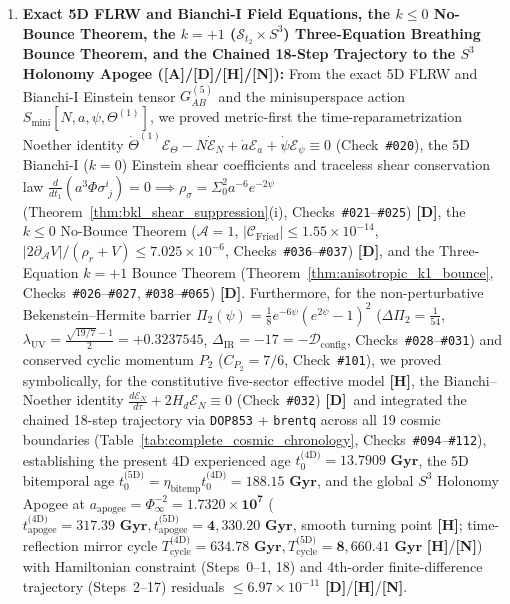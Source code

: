 \documentclass[11pt,a4paper]{article}
\newcommand{\catA}{\textbf{\textcolor{purple!80!black}{[A]}}}
\newcommand{\catD}{\textbf{\textcolor{blue!75!black}{[D]}}}
\newcommand{\catH}{\textbf{\textcolor{orange!85!black}{[H]}}}
\newcommand{\catN}{\textbf{\textcolor{teal!75!black}{[N]}}}
\theoremstyle{plain}
\theoremstyle{definition}
\theoremstyle{remark}
\numberwithin{equation}{section}
\begin{document}
\begin{enumerate}
    \item \textbf{Exact 5D FLRW and Bianchi-I Field Equations, the $k \le 0$ No-Bounce Theorem, the $k = +1$ ($\mathcal{S}_{t_2} \times S^3$) Three-Equation Breathing Bounce Theorem, and the Chained 18-Step Trajectory to the $S^3$ Holonomy Apogee (\catA/\catD/\catH/\catN):} From the exact 5D FLRW and Bianchi-I Einstein tensor $G_{AB}^{(5)}$ and the minisuperspace action $S_{\text{mini}}[N,a,\psi,\Theta^{(1)}]$, we proved metric-first the time-reparametrization Noether identity $\dot{\Theta}^{(1)}\mathcal{E}_{\Theta} - N\dot{\mathcal{E}}_N + \dot{a}\mathcal{E}_a + \dot{\psi}\mathcal{E}_{\psi} \equiv 0$ (Check~\texttt{\#020}), the 5D Bianchi-I ($k = 0$) Einstein shear coefficients and traceless shear conservation law $\frac{d}{dt_1}(a^3\Phi\sigma^i_{\;j}) = 0 \implies \rho_{\sigma} = \Sigma_0^2 a^{-6}e^{-2\psi}$ (Theorem~\ref{thm:bkl_shear_suppression}(i), Checks~\texttt{\#021}--\texttt{\#025}) \catD, the $k \le 0$ No-Bounce Theorem ($\mathcal{A} = 1$, $|\mathcal{C}_{\text{Fried}}| \le 1.55 \times 10^{-14}$, $|2\partial_{\mathcal{A}}V|/(\rho_r+V) \le 7.025 \times 10^{-6}$, Checks~\texttt{\#036}--\texttt{\#037}) \catD, and the Three-Equation $k = +1$ Bounce Theorem (Theorem~\ref{thm:anisotropic_k1_bounce}, Checks~\texttt{\#026}--\texttt{\#027}, \texttt{\#038}--\texttt{\#065}) \catD. Furthermore, for the non-perturbative Bekenstein--Hermite barrier $\Pi_2(\psi) = \frac{1}{8}e^{-6\psi}(e^{2\psi}-1)^2$ ($\Delta\Pi_2 = \frac{1}{54}$, $\lambda_{\text{UV}} = \frac{\sqrt{19/7}-1}{2} = +0.3237545$, $\Delta_{\text{IR}} = -17 = -\mathcal{D}_{\text{config}}$, Checks~\texttt{\#028}--\texttt{\#031}) and conserved cyclic momentum $P_2$ ($C_{P_2} = 7/6$, Check~\texttt{\#101}), we proved symbolically, for the constitutive five-sector effective model \catH, the Bianchi--Noether identity $\frac{d\mathcal{E}_N}{d\tau} + 2H_d\mathcal{E}_N \equiv 0$ (Check~\texttt{\#032}) \catD\ and integrated the chained 18-step trajectory via \texttt{DOP853} + \texttt{brentq} across all 19 cosmic boundaries (Table~\ref{tab:complete_cosmic_chronology}, Checks~\texttt{\#094}--\texttt{\#112}), establishing the present 4D experienced age $t_0^{\text{(4D)}} = \mathbf{13.7909\text{ Gyr}}$, the 5D bitemporal age $t_0^{\text{(5D)}} = \eta_{\text{bitemp}}t_0^{\text{(4D)}} = \mathbf{188.15\text{ Gyr}}$, and the global $S^3$ Holonomy Apogee at $a_{\text{apogee}} = \Phi_{\infty}^{-2} = \mathbf{1.7320 \times 10^7}$ ($t_{\text{apogee}}^{\text{(4D)}} = \mathbf{317.39\text{ Gyr}}, t_{\text{apogee}}^{\text{(5D)}} = \mathbf{4{,}330.20\text{ Gyr}}$, smooth turning point \catH; time-reflection mirror cycle $T_{\text{cycle}}^{\text{(4D)}} = \mathbf{634.78\text{ Gyr}}, T_{\text{cycle}}^{\text{(5D)}} = \mathbf{8{,}660.41\text{ Gyr}}$ \catH/\catN) with Hamiltonian constraint (Steps~0--1, 18) and 4th-order finite-difference trajectory (Steps~2--17) residuals $\le 6.97 \times 10^{-11}$ \catD/\catH/\catN.

\end{enumerate}
\end{document}
